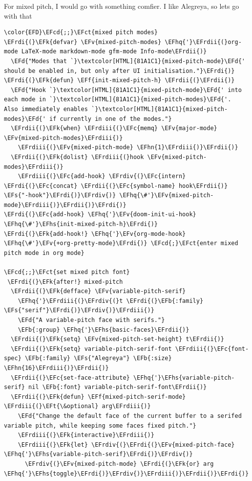 \documentclass{scrartcl}
\newcommand{\EFk}[1]{\textcolor{EFk}{#1}} %
\newcommand{\EFd}[1]{\textcolor{EFd}{#1}} %
\newcommand{\EFt}[1]{\textcolor{EFt}{#1}} %
\newcommand{\EFs}[1]{\textcolor{EFs}{#1}} %
\newcommand{\EFb}[1]{\textcolor{EFb}{#1}} %
\newcommand{\EFct}[1]{\textcolor{EFct}{#1}} %
\newcommand{\EFc}[1]{\textcolor{EFc}{#1}} %
\newcommand{\EFv}[1]{\textcolor{EFv}{#1}} %
\newcommand{\EFf}[1]{\textcolor{EFf}{#1}} %
\newcommand{\EFcd}[1]{\textcolor{EFcd}{#1}} %
\newcommand{\EFhn}[1]{#1} %
\newcommand{\EFhq}[1]{#1} %
\newcommand{\EFhs}[1]{#1} %
\newcommand{\EFrdi}[1]{#1} %
\newcommand{\EFrdii}[1]{#1} %
\newcommand{\EFrdiii}[1]{#1} %
\newcommand{\EFrdiv}[1]{#1} %
\begin{document}
For mixed pitch, I would go with something comfier. I like Alegreya, so lets go with that
\begin{Code}
\begin{Verbatim}[]
\color{EFD}\EFcd{;;}\EFct{mixed pitch modes}
\EFrdi{(}\EFk{defvar} \EFv{mixed-pitch-modes} \EFhq{'}\EFrdii{(}org-mode LaTeX-mode markdown-mode gfm-mode Info-mode\EFrdii{)}
  \EFd{"Modes that `}\textcolor[HTML]{81A1C1}{mixed-pitch-mode}\EFd{' should be enabled in, but only after UI initialisation."}\EFrdi{)}
\EFrdi{(}\EFk{defun} \EFf{init-mixed-pitch-h} \EFrdii{(}\EFrdii{)}
  \EFd{"Hook `}\textcolor[HTML]{81A1C1}{mixed-pitch-mode}\EFd{' into each mode in `}\textcolor[HTML]{81A1C1}{mixed-pitch-modes}\EFd{'.
Also immediately enables `}\textcolor[HTML]{81A1C1}{mixed-pitch-modes}\EFd{' if currently in one of the modes."}
  \EFrdii{(}\EFk{when} \EFrdiii{(}\EFc{memq} \EFv{major-mode} \EFv{mixed-pitch-modes}\EFrdiii{)}
    \EFrdiii{(}\EFv{mixed-pitch-mode} \EFhn{1}\EFrdiii{)}\EFrdii{)}
  \EFrdii{(}\EFk{dolist} \EFrdiii{(}hook \EFv{mixed-pitch-modes}\EFrdiii{)}
    \EFrdiii{(}\EFc{add-hook} \EFrdiv{(}\EFc{intern} \EFrdi{(}\EFc{concat} \EFrdii{(}\EFc{symbol-name} hook\EFrdii{)} \EFs{"-hook"}\EFrdi{)}\EFrdiv{)} \EFhq{\#'}\EFv{mixed-pitch-mode}\EFrdiii{)}\EFrdii{)}\EFrdi{)}
\EFrdi{(}\EFc{add-hook} \EFhq{'}\EFv{doom-init-ui-hook} \EFhq{\#'}\EFhs{init-mixed-pitch-h}\EFrdi{)}
\EFrdi{(}\EFk{add-hook!} \EFhq{'}\EFv{org-mode-hook} \EFhq{\#'}\EFv{+org-pretty-mode}\EFrdi{)} \EFcd{;}\EFct{enter mixed pitch mode in org mode}

\EFcd{;;}\EFct{set mixed pitch font}
 \EFrdi{(}\EFk{after!} mixed-pitch
  \EFrdii{(}\EFk{defface} \EFv{variable-pitch-serif}
    \EFhq{'}\EFrdiii{(}\EFrdiv{(}t \EFrdi{(}\EFb{:family} \EFs{"serif"}\EFrdi{)}\EFrdiv{)}\EFrdiii{)}
    \EFd{"A variable-pitch face with serifs."}
    \EFb{:group} \EFhq{'}\EFhs{basic-faces}\EFrdii{)}
  \EFrdii{(}\EFk{setq} \EFv{mixed-pitch-set-height} t\EFrdii{)}
  \EFrdii{(}\EFk{setq} variable-pitch-serif-font \EFrdiii{(}\EFc{font-spec} \EFb{:family} \EFs{"Alegreya"} \EFb{:size} \EFhn{16}\EFrdiii{)}\EFrdii{)}
  \EFrdii{(}\EFc{set-face-attribute} \EFhq{'}\EFhs{variable-pitch-serif} nil \EFb{:font} variable-pitch-serif-font\EFrdii{)}
  \EFrdii{(}\EFk{defun} \EFf{mixed-pitch-serif-mode} \EFrdiii{(}\EFt{\&optional} arg\EFrdiii{)}
    \EFd{"Change the default face of the current buffer to a serifed variable pitch, while keeping some faces fixed pitch."}
    \EFrdiii{(}\EFk{interactive}\EFrdiii{)}
    \EFrdiii{(}\EFk{let} \EFrdiv{(}\EFrdi{(}\EFv{mixed-pitch-face} \EFhq{'}\EFhs{variable-pitch-serif}\EFrdi{)}\EFrdiv{)}
      \EFrdiv{(}\EFv{mixed-pitch-mode} \EFrdi{(}\EFk{or} arg \EFhq{'}\EFhs{toggle}\EFrdi{)}\EFrdiv{)}\EFrdiii{)}\EFrdii{)}\EFrdi{)}
\end{Verbatim}
\end{Code}
\end{document}
